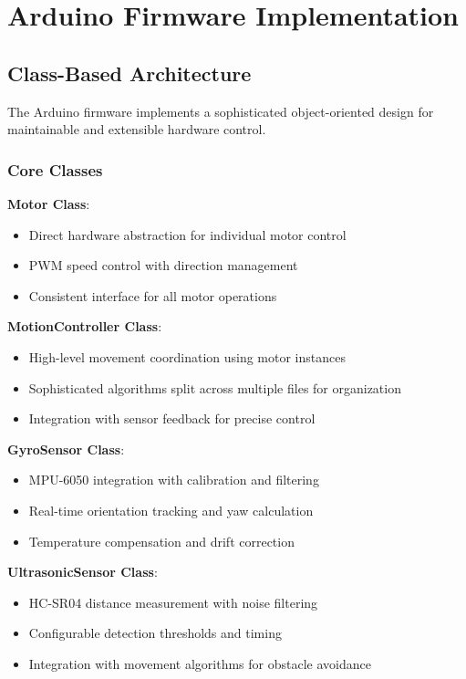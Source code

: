 \section{Arduino Firmware Implementation}

\subsection{Class-Based Architecture}

The Arduino firmware implements a sophisticated object-oriented design for maintainable and extensible hardware control.

\subsubsection{Core Classes}
\textbf{Motor Class}:
\begin{itemize}
    \item Direct hardware abstraction for individual motor control
    \item PWM speed control with direction management
    \item Consistent interface for all motor operations
\end{itemize}

\textbf{MotionController Class}:
\begin{itemize}
    \item High-level movement coordination using motor instances
    \item Sophisticated algorithms split across multiple files for organization
    \item Integration with sensor feedback for precise control
\end{itemize}

\textbf{GyroSensor Class}:
\begin{itemize}
    \item MPU-6050 integration with calibration and filtering
    \item Real-time orientation tracking and yaw calculation
    \item Temperature compensation and drift correction
\end{itemize}

\textbf{UltrasonicSensor Class}:
\begin{itemize}
    \item HC-SR04 distance measurement with noise filtering
    \item Configurable detection thresholds and timing
    \item Integration with movement algorithms for obstacle avoidance
\end{itemize}


